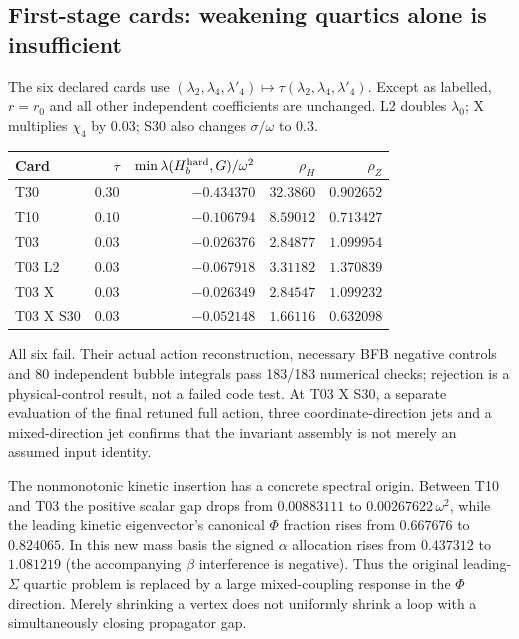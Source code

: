 \documentclass[11pt]{article}
\begin{document}
\subsection{First-stage cards: weakening quartics alone is insufficient}
The six declared cards use
$(\lambda_2,\lambda_4,\lambda'_4)\mapsto
\tau(\lambda_2,\lambda_4,\lambda'_4)$.
Except as labelled, $r=r_0$ and all other independent coefficients are
unchanged. L2 doubles $\lambda_0$; X multiplies $\chi_4$ by $0.03$;
S30 also changes $\sigma/\omega$ to $0.3$.
\begin{center}\small
\begin{tabular}{lrrrr}
\toprule Card & $\tau$ & $\min\lambda(H_b^{\rm hard},G)/\omega^2$
& $\rho_H$ & $\rho_Z$\\\midrule
T30 & $0.30$ & $-0.434370$ & $32.3860$ & $0.902652$\\
T10 & $0.10$ & $-0.106794$ & $8.59012$ & $0.713427$\\
T03 & $0.03$ & $-0.026376$ & $2.84877$ & $1.099954$\\
T03 L2 & $0.03$ & $-0.067918$ & $3.31182$ & $1.370839$\\
T03 X & $0.03$ & $-0.026349$ & $2.84547$ & $1.099232$\\
T03 X S30 & $0.03$ & $-0.052148$ & $1.66116$ & $0.632098$\\\bottomrule
\end{tabular}
\end{center}
All six fail. Their actual action reconstruction, necessary BFB negative
controls and 80 independent bubble integrals pass 183/183 numerical
checks; rejection is a physical-control result, not a failed code test.
At T03 X S30, a separate evaluation of the final retuned full action,
three coordinate-direction jets and a mixed-direction jet confirms
that the invariant assembly is not merely an assumed input identity.

The nonmonotonic kinetic insertion has a concrete spectral origin.
Between T10 and T03 the positive scalar gap drops from
$0.00883111$ to $0.00267622\,\omega^2$, while the leading kinetic
eigenvector's canonical $\Phi$ fraction rises from $0.667676$ to
$0.824065$. In this new mass basis the signed $\alpha$ allocation
rises from $0.437312$ to $1.081219$ (the accompanying $\beta$
interference is negative). Thus the original leading-$\Sigma$
quartic problem is replaced by a large mixed-coupling response in the
$\Phi$ direction. Merely shrinking a vertex does not uniformly shrink
a loop with a simultaneously closing propagator gap.
\end{document}
